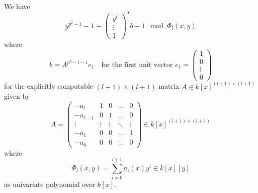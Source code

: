 \begin{lemma}
    \label{prop:symbolic_elimination}
    We have
    \begin{equation*}
        y^{p^2 - 1} - 1 \equiv \left(\begin{matrix*}
            y^l \\
            \vdots \\
            1
        \end{matrix*}\right)^T b - 1 \mod \Phi_l(x, y)
    \end{equation*}
    where
    \begin{equation*}
        b = A^{p^2 - l - 1} e_1 \quad \text{for the first unit vector $e_1 = \left(\begin{matrix*}
            1 \\
            0 \\
            \vdots \\
            0
        \end{matrix*}\right)$}
    \end{equation*}
    for the explicitly computable $(l + 1) \times (l + 1)$ matrix $A \in k[x]^{(l + 1) \times (l + 1)}$ given by
    \begin{equation*}
        A = \left( \begin{matrix*}
            -a_l & 1 & 0 & \dots & 0 \\
            -a_{l - 1} & 0 & 1 & \dots & 0 \\
            \vdots & \vdots & \vdots & \ddots & \vdots \\
            -a_1 & 0 & 0 & \dots & 1 \\
            -a_0 & 0 & 0 & \dots & 0
        \end{matrix*} \right) \in k[x]^{(l + 1) \times (l + 1)}
    \end{equation*}
    where
    \begin{equation*}
        \Phi_l(x, y) = \sum_{i = 0}^{l + 1} a_i(x) y^i \in k[x][y]
    \end{equation*}
    as univariate polynomial over $k[x]$.
\end{lemma}
